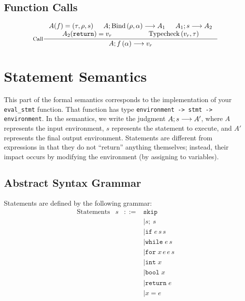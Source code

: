 \documentclass[10pt]{article}
\begin{document}
\subsection{Function Calls}

$$
\begin{array}{c}
\inference[Call]
{
    A(f) = \left(\tau,\rho,s\right) 
    & \config{\mathrm{Bind}\left(\rho, \alpha\right)} --> A_1 
    & \config[A_1]{s} --> A_2 \\
    A_2(\mathtt{return}) = v_r & \mathrm{Typecheck}\left(v_r, \tau \right)
}
{\config{f\left(\alpha\right)} --> v_r}
\end{array}
$$

\section{Statement Semantics}

This part of the formal semantics corresponds to the implementation of
your \texttt{eval\_stmt} function. That function has type
\texttt{environment -> stmt -> environment}. In the semantics, we write the
judgment ${A};{s} --> A'$, where $A$ represents the input environment, $s$
represents the statement to execute, and $A'$ represents the final output
environment. Statements are different from expressions in that they do
not ``return'' anything themselves; instead, their impact occurs by
modifying the environment (by assigning to variables).

\subsection{Abstract Syntax Grammar}

Statements are defined by the following grammar:
\[
\begin{array}{lrcl}
\mathrm{Statements} & s & \mathtt{::=} & \mathtt{skip} \\
& & & \mid s\mathtt{;}\: s \\
& & & \mid \mathtt{if}\;e\,s\,s \\ 
& & & \mid \mathtt{while}\;e\,s \\
& & & \mid \mathtt{for}\;x\,e\,e\,s \\
& & & \mid \mathtt{int}\;x \\ 
& & & \mid \mathtt{bool}\;x \\
& & & \mid \mathtt{return}\;e \\
& & & \mid x = e\\
\end{array}
\]
\end{document}
